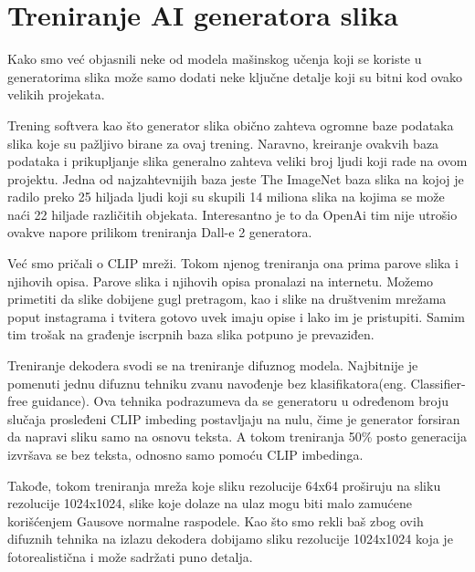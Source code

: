 \documentclass[12pt, letterpaper]{article}
\begin{document}
\pagebreak

\section{Treniranje AI generatora slika}

Kako smo već objasnili neke od modela mašinskog učenja koji se koriste u generatorima slika može samo dodati neke ključne detalje koji su bitni kod ovako velikih projekata.

Trening softvera kao što generator slika obično zahteva ogromne baze podataka slika koje su pažljivo birane za ovaj trening. Naravno, kreiranje ovakvih baza podataka i prikupljanje slika generalno zahteva veliki broj ljudi koji rade na ovom projektu. Jedna od najzahtevnijih baza jeste The ImageNet baza slika na kojoj je radilo preko 25 hiljada ljudi koji su skupili 14 miliona slika na kojima se može naći 22 hiljade različitih objekata. Interesantno je to da OpenAi tim nije utrošio ovakve napore prilikom treniranja Dall-e 2 generatora. \cite{clip}

Već smo pričali o CLIP mreži. Tokom njenog treniranja ona prima parove slika i njihovih opisa. Parove slika i njihovih opisa pronalazi na internetu. Možemo primetiti da slike dobijene gugl pretragom, kao i slike na društvenim mrežama poput instagrama i tvitera gotovo uvek imaju opise i lako im je pristupiti. Samim tim trošak na građenje iscrpnih baza slika potpuno je prevaziđen.\cite{clip, openai_dali}

Treniranje dekodera svodi se na treniranje difuznog modela. Najbitnije je pomenuti jednu difuznu tehniku zvanu navođenje bez klasifikatora(eng. Classifier-free guidance). Ova tehnika podrazumeva da se generatoru u određenom broju slučaja prosleđeni CLIP imbeding postavljaju na nulu, čime je generator forsiran da napravi sliku samo na osnovu teksta. A tokom treniranja 50\% posto generacija izvršava se bez teksta, odnosno samo pomoću CLIP imbedinga.

Takođe, tokom treniranja mreža koje sliku rezolucije 64x64 proširuju na sliku rezolucije 1024x1024, slike koje dolaze na ulaz mogu biti malo zamućene korišćenjem Gausove normalne raspodele. Kao što smo rekli baš zbog ovih difuznih tehnika na izlazu dekodera dobijamo sliku rezolucije 1024x1024 koja je fotorealistična i može sadržati puno detalja.\cite{openai_dali}

\pagebreak
\end{document}
